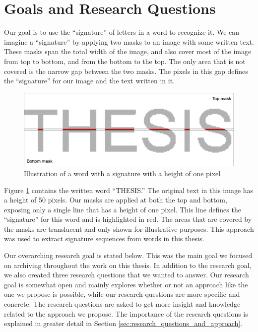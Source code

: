 
\section{Goals and Research Questions}
\label{sec:goals_and_research_questions}
Our goal is to use the ``signature'' of letters in a word to recognize it. We can imagine a ``signature'' by applying two masks to an image with some written text. These masks span the total width of the image, and also cover most of the image from top to bottom, and from the bottom to the top. The only area that is not covered is the narrow gap between the two masks. The pixels in this gap defines the ``signature'' for our image and the text written in it.

\begin{figure}[ht]
    \centering
    \includegraphics[width=1.\textwidth]{fig/chapter1/signature2.png}
    \caption{Illustration of a word with a signature with a height of one pixel}
    \label{fig:thesis-signature}
\end{figure}

Figure \ref{fig:thesis-signature} contains the written word ``THESIS.'' The original text in this image has a height of 50 pixels. Our masks are applied at both the top and bottom, exposing only a single line that has a height of one pixel. This line defines the ``signature'' for this word and is highlighted in red. The areas that are covered by the masks are translucent and only shown for illustrative purposes. This approach was used to extract signature sequences from words in this thesis.

Our overarching research goal is stated below. This was the main goal we focused on archiving throughout the work on this thesis. In addition to the research goal, we also created three research questions that we wanted to answer. Our research goal is somewhat open and mainly explores whether or not an approach like the one we propose is possible, while our research questions are more specific and concrete. The research questions are asked to get more insight and knowledge related to the approach we propose. The importance of the research questions is explained in greater detail in Section \ref{sec:research_questions_and_approach}.

